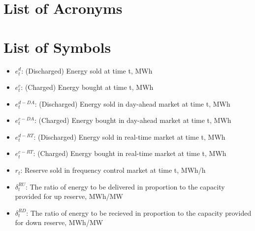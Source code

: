 \chapter*{List of Acronyms}
%




\chapter*{List of Symbols}
%

\begin{itemize}
	\item $e_t^d$: (Discharged) Energy sold at time t, MWh
	\item $e_t^c$: (Charged) Energy bought at time t, MWh
	\item $e_t^{d-DA}$: (Discharged) Energy sold in day-ahead market at time t, MWh
	\item $e_t^{c-DA}$: (Charged) Energy bought  in day-ahead market at time t, MWh
	\item $e_t^{d-RT}$: (Discharged) Energy sold in real-time market at time t, MWh
	\item $e_t^{c-RT}$: (Charged) Energy bought  in real-time market at time t, MWh
	\item $r_t$: Reserve sold in frequency control market at time t, MWh/h
	\item $\delta_t^{RU}$: The ratio of energy to be delivered in proportion to the capacity provided for up reserve, MWh/MW
	\item $\delta_t^{RD}$: The ratio of energy to be recieved in proportion to the capacity provided for down reserve, MWh/MW
	

\end{itemize}
